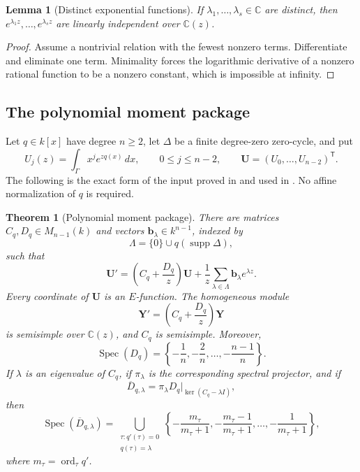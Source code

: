 \documentclass[11pt]{article}
\numberwithin{equation}{section}
\newtheorem{theorem}{Theorem}[section]
\newtheorem{lemma}[lemma]{Lemma}
\theoremstyle{definition}
\theoremstyle{remark}
\newcommand{\C}{\mathbb C}
\newcommand{\Spec}{\operatorname{Spec}}
\newcommand{\ord}{\operatorname{ord}}
\begin{document}
\begin{lemma}[Distinct exponential functions]\label{lem:distinct-exponentials}
If $\lambda_1,\ldots,\lambda_s\in\C$ are distinct, then
$e^{\lambda_1z},\ldots,e^{\lambda_sz}$ are linearly independent over
$\C(z)$.
\end{lemma}

\begin{proof}
Assume a nontrivial relation with the fewest nonzero terms.  Differentiate
and eliminate one term.  Minimality forces the logarithmic derivative of a
nonzero rational function to be a nonzero constant, which is impossible at
infinity.
\end{proof}

\subsection{The polynomial moment package}

Let $q\in k[x]$ have degree $n\ge2$, let $\Delta$ be a finite degree-zero
zero-cycle, and put
\[
  U_j(z)=\int_\Gamma x^j e^{zq(x)}\,dx,
  \qquad 0\le j\le n-2,
  \qquad
  \mathbf U=(U_0,\ldots,U_{n-2})^{\mathsf T}.
\]
The following is the exact form of the input proved in \cite{LongEIT} and
used in \cite{LongLinearKZ}.  No affine normalization of $q$ is required.

\begin{theorem}[Polynomial moment package]\label{thm:moment-package}
There are matrices $C_q,D_q\in M_{n-1}(k)$ and vectors
$\mathbf b_\lambda\in k^{n-1}$, indexed by
\[
  \Lambda=\{0\}\cup q(\operatorname{supp}\Delta),
\]
such that
\begin{equation}\label{eq:moment-system}
  \mathbf U'
  =\left(C_q+\frac{D_q}{z}\right)\mathbf U
   +\frac1z\sum_{\lambda\in\Lambda}
      \mathbf b_\lambda e^{\lambda z}.
\end{equation}
Every coordinate of $\mathbf U$ is an $E$-function.  The homogeneous module
\begin{equation}\label{eq:homogeneous}
  \mathbf Y'=\left(C_q+\frac{D_q}{z}\right)\mathbf Y
\end{equation}
is semisimple over $\C(z)$, and $C_q$ is semisimple.  Moreover,
\begin{equation}\label{eq:global-D-spectrum}
  \Spec(D_q)=
  \left\{-\frac1n,-\frac2n,\ldots,-\frac{n-1}{n}\right\}.
\end{equation}
If $\lambda$ is an eigenvalue of $C_q$, if $\pi_\lambda$ is the corresponding
spectral projector, and if
\[
  \overline D_{q,\lambda}
  =\pi_\lambda D_q|_{\ker(C_q-\lambda I)},
\]
then
\begin{equation}\label{eq:compressed-spectrum}
  \Spec(\overline D_{q,\lambda})
  =\bigcup_{\substack{\tau:q'(\tau)=0\\q(\tau)=\lambda}}
    \left\{-\frac{m_\tau}{m_\tau+1},
    -\frac{m_\tau-1}{m_\tau+1},\ldots,
    -\frac1{m_\tau+1}\right\},
\end{equation}
where $m_\tau=\ord_\tau q'$.
\end{theorem}
\end{document}
